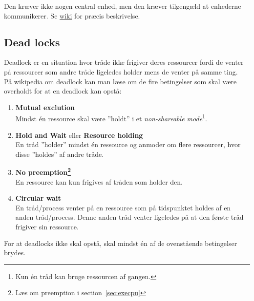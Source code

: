 Den kræver ikke nogen central enhed, men den kræver tilgengæld at enhederne kommunikerer. Se \href{https://en.wikipedia.org/wiki/Dining_philosophers_problem#Chandy.2FMisra_solution}{wiki} for præcis beskrivelse.

\subsection{Dead locks}\label{sec:deadlock}
Deadlock er en situation hvor tråde ikke frigiver deres ressourcer fordi de venter på ressourcer som andre tråde ligeledes holder mens de venter på samme ting.\\

På wikipedia om \href{https://en.wikipedia.org/wiki/Deadlock}{deadlock} kan man læse om de fire betingelser som skal være overholdt for at en deadlock kan opstå:
\begin{enumerate}
	\item \textbf{Mutual exclution}\\
	Mindst én ressource skal være ''holdt'' i et \textit{non-shareable mode}\footnote{Kun én tråd kan bruge ressourcen af gangen.}.
	\item \textbf{Hold and Wait} eller \textbf{Resource holding}\\
	En tråd ''holder'' mindst én ressource og anmoder om flere ressourcer, hvor disse ''holdes'' af andre tråde.
	\item \textbf{No preemption\footnote{Læs om preemption i section~\ref{sec:execpu}}}\\
	En ressource kan kun frigives af tråden som holder den.
	\item \textbf{Circular wait}\\
	En tråd/process venter på en ressource som på tidspunktet holdes af en anden tråd/process. Denne anden tråd venter ligeledes på at den første tråd frigiver sin ressource.
\end{enumerate}

For at deadlocks ikke skal opstå, skal mindst én af de ovenstående betingelser brydes.
